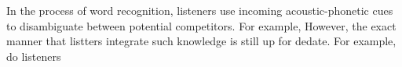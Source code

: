 In the process of word recognition, listeners use incoming acoustic-phonetic cues to disambiguate between potential competitors. For example, However, the exact manner that listters integrate such knowledge is still up for dedate. For example, do listeners 